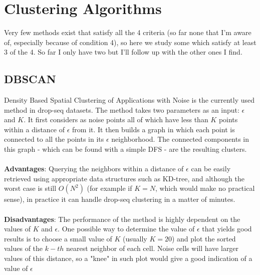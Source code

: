 \documentclass[11pt]{article}
\begin{document}
\section{Clustering Algorithms}
Very few methods exist that satisfy all the 4 criteria (so far none that I'm aware of, especially because of condition 4), so here we study some which satisfy at least 3 of the 4. So far I only have two but I'll follow up with the other ones I find. 

\subsection{DBSCAN}
Density Based Spatial Clustering of Applications with Noise \cite{dbscan} is the currently used method in drop-seq datasets. The method takes two parameters as an input: $\epsilon$ and $K$. It first considers as noise points all of which have less than $K$ points within a distance of $\epsilon$ from it. It then builds a graph in which each point is connected to all the points in its $\epsilon$ neighborhood. The connected components in this graph - which can be found with a simple DFS - are the resulting clusters. \\
\\
\textbf{Advantages}: Querying the neighbors within a distance of $\epsilon$ can be easily retrieved using appropriate data structures such as KD-tree, and although the worst case is still $O(N^2)$ (for example if $K=N$, which would make no practical sense), in practice it can handle drop-seq clustering in a matter of minutes. \\
\\
\textbf{Disadvantages}: The performance of the method is highly dependent on the values of $K$ and $\epsilon$. One possible way to determine the value of $\epsilon$ that yields good results is to choose a small value of $K$ (usually $K=20$) and plot the sorted values of the $k-th$ nearest neighbor of each cell. Noise cells will have larger values of this distance, so a "knee" in such plot would give a good indication of a value of $\epsilon$
\end{document}
